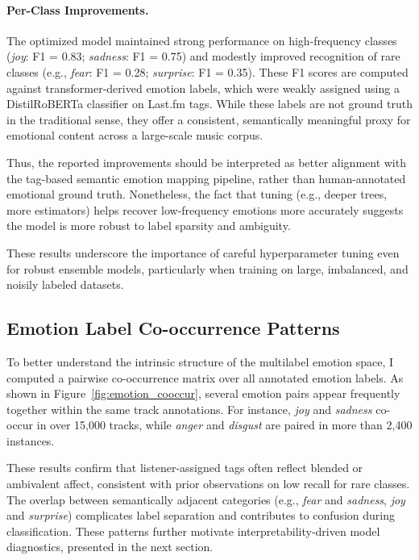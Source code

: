\documentclass{article}
\begin{document}
\paragraph{Per-Class Improvements.}
The optimized model maintained strong performance on high-frequency classes (\textit{joy}: F1 = 0.83; \textit{sadness}: F1 = 0.75) and modestly improved recognition of rare classes (e.g., \textit{fear}: F1 = 0.28; \textit{surprise}: F1 = 0.35). These F1 scores are computed against transformer-derived emotion labels, which were weakly assigned using a DistilRoBERTa classifier on Last.fm tags. While these labels are not ground truth in the traditional sense, they offer a consistent, semantically meaningful proxy for emotional content across a large-scale music corpus.

Thus, the reported improvements should be interpreted as better alignment with the tag-based semantic emotion mapping pipeline, rather than human-annotated emotional ground truth. Nonetheless, the fact that tuning (e.g., deeper trees, more estimators) helps recover low-frequency emotions more accurately suggests the model is more robust to label sparsity and ambiguity.

These results underscore the importance of careful hyperparameter tuning even for robust ensemble models, particularly when training on large, imbalanced, and noisily labeled datasets.

\subsection{Emotion Label Co-occurrence Patterns}

To better understand the intrinsic structure of the multilabel emotion space, I computed a pairwise co-occurrence matrix over all annotated emotion labels. As shown in Figure~\ref{fig:emotion_cooccur}, several emotion pairs appear frequently together within the same track annotations. For instance, \textit{joy} and \textit{sadness} co-occur in over 15,000 tracks, while \textit{anger} and \textit{disgust} are paired in more than 2,400 instances.

These results confirm that listener-assigned tags often reflect blended or ambivalent affect, consistent with prior observations on low recall for rare classes. The overlap between semantically adjacent categories (e.g., \textit{fear} and \textit{sadness}, \textit{joy} and \textit{surprise}) complicates label separation and contributes to confusion during classification. These patterns further motivate interpretability-driven model diagnostics, presented in the next section.
\end{document}
